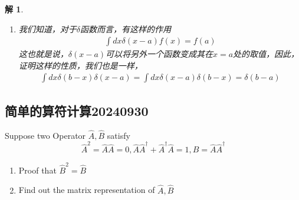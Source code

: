 \documentclass{article}
\newtheorem{solution}{解}
\begin{document}
\begin{solution}
\begin{enumerate}
\begin{align*}
        &=\frac{\delta(x-a)}{|2a|}+\frac{x+a}{2|a|}\\
        &=\frac{1}{2|a|}\left[\delta(x-a)+\delta(x+a)\right]
    \end{align*}
    \item[(e)] 我们知道，对于$\delta $函数而言，有这样的作用
    \begin{align*}
        \int dx\delta(x-a)f(x)=f(a)
    \end{align*}
    这也就是说，$\delta(x-a)$可以将另外一个函数变成其在$x=a$处的取值，因此，证明这样的性质，我们也是一样，
    \begin{align*}
        \int dx \delta(b-x)\delta(x-a)=\int dx \delta(x-a)\delta(b-x)=\delta(b-a)
    \end{align*}
\end{enumerate}

\end{solution}







\subsection{简单的算符计算20240930}
Suppose two Operator $\hat{A},\hat{B}$ satisfy
\[\hat{A}^2=\hat{A}\hat{A}=0,\hat{A}\hat{A}^\dagger+\hat{A}^\dagger\hat{A}=1,B=\hat{A}\hat{A}^\dagger\]
\begin{enumerate}
    \item[(1)] Proof that $\hat{B}^2=\hat{B}$
    \item[(2)] Find out the matrix representation of $\hat{A},\hat{B}$
\end{enumerate}
\end{document}

